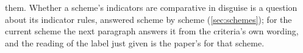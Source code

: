 them. Whether a scheme's indicators are comparative in disguise is a question about its indicator rules, answered scheme by scheme (\autoref{sec:schemes}); for the current scheme the next paragraph answers it from the criteria's own wording, and the reading of the label just given is the paper's for that scheme.
